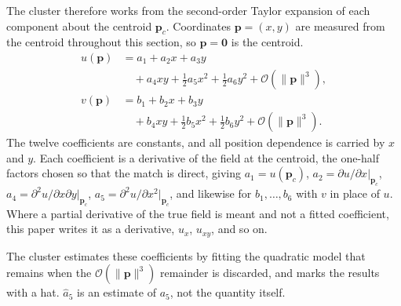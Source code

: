 \documentclass[lettersize,journal]{IEEEtran}
\begin{document}
The cluster therefore works from the second-order Taylor expansion of
each component about the centroid $\mathbf{p}_c$. Coordinates
$\mathbf{p} = (x, y)$ are measured from the centroid throughout this
section, so $\mathbf{p} = \mathbf{0}$ is the centroid.
\begin{align}
    u(\mathbf{p}) &= a_1 + a_2 x + a_3 y
        \nonumber \\
        &\quad + a_4 xy + \tfrac{1}{2} a_5 x^2 + \tfrac{1}{2} a_6 y^2
        + \mathcal{O}(\|\mathbf{p}\|^3),
        \label{eq:quad_model_u} \\
    v(\mathbf{p}) &= b_1 + b_2 x + b_3 y
        \nonumber \\
        &\quad + b_4 xy + \tfrac{1}{2} b_5 x^2 + \tfrac{1}{2} b_6 y^2
        + \mathcal{O}(\|\mathbf{p}\|^3).
        \label{eq:quad_model_v}
\end{align}
The twelve coefficients are constants, and all position dependence is
carried by $x$ and $y$. Each coefficient is a derivative of the field at
the centroid, the one-half factors chosen so that the match is direct,
giving $a_1 = u(\mathbf{p}_c)$, $a_2 = \partial u/\partial
x|_{\mathbf{p}_c}$, $a_4 = \partial^2 u/\partial x \partial
y|_{\mathbf{p}_c}$, $a_5 = \partial^2 u/\partial x^2|_{\mathbf{p}_c}$,
and likewise for $b_1, \ldots, b_6$ with $v$ in place of $u$. Where a
partial derivative of the true field is meant and not a fitted
coefficient, this paper writes it as a derivative, $u_x$, $u_{xy}$, and
so on.

The cluster estimates these coefficients by fitting the quadratic model
that remains when the $\mathcal{O}(\|\mathbf{p}\|^3)$ remainder is
discarded, and marks the results with a hat. $\hat{a}_5$ is an estimate
of $a_5$, not the quantity itself.
\end{document}
